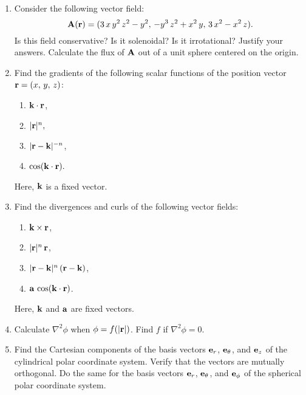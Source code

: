 {\begin{enumerate}
\item Consider the following vector field:
$$
{\bf A}({\bf r}) = (3\,x\,y^2\,z^2-y^2,\,-y^3\,z^2+x^2\,y,\,3\,x^2-x^2\,z).
$$
Is this field conservative? Is it solenoidal? Is it irrotational? Justify your answers. Calculate the flux of ${\bf A}$ out of a unit sphere centered
on the origin.

\item Find the gradients of the following scalar functions of the position vector ${\bf r}=(x,\,y,\,z)$:
\begin{enumerate}
\item ${\bf k}\cdot{\bf r}$,
\item $|{\bf r}|^n,$
\item $|{\bf r}-{\bf k}|^{-n}$,
\item $\cos({\bf k}\cdot {\bf r}).$
\end{enumerate}
Here, ${\bf k}$ is a fixed vector.

\item Find the divergences and curls of the following vector fields:
\begin{enumerate}
\item ${\bf k}\times {\bf r}$,
\item $|{\bf r}|^n\,{\bf r}$,
\item $|{\bf r} - {\bf k}|^{n}\,({\bf r}-{\bf k})$,
\item ${\bf a}\,\cos({\bf k}\cdot {\bf r})$.
\end{enumerate}
Here, ${\bf k}$ and ${\bf a}$ are fixed vectors.

\item Calculate $\nabla^2\phi$ when  $\phi=f(|{\bf r} |)$. Find $f$
if $\nabla^2\phi=0$. 

\item Find the Cartesian components of the basis vectors ${\bf e}_r$,
${\bf e}_\theta$, and ${\bf e}_z$ of the cylindrical polar coordinate
system. Verify that the vectors are mutually orthogonal. Do the
same for the basis vectors ${\bf e}_r$, ${\bf e}_\theta$, and ${\bf e}_\phi$ of the spherical polar coordinate system.

\end{enumerate}
\renewcommand{\theenumi}{\arabic{enumi}}}
